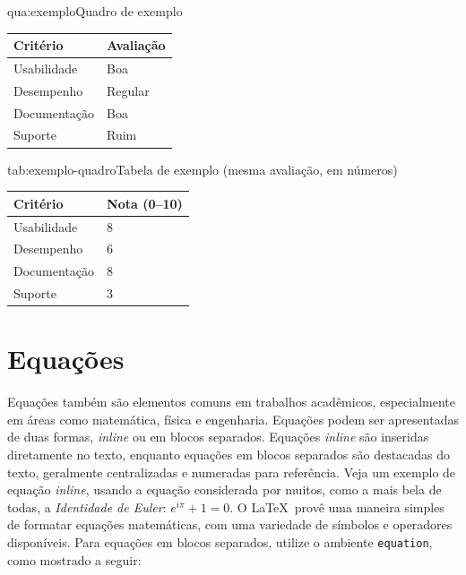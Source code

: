 \begin{quadroabnt}{qua:exemplo}{Quadro de exemplo}
    \caption*{Avaliação qualitativa: o dado central de cada célula é uma palavra, não um número — por isso é um Quadro, não uma Tabela.}
    \begin{tabular}{@{}ll@{}}
        \toprule
        Critério    & Avaliação \\ \midrule
        Usabilidade & Boa       \\
        Desempenho  & Regular   \\
        Documentação & Boa      \\
        Suporte     & Ruim      \\ \bottomrule
    \end{tabular}
\end{quadroabnt}

\begin{tabelaabnt}{tab:exemplo-quadro}{Tabela de exemplo (mesma avaliação, em números)}
    \caption*{A mesma avaliação do , agora com o dado numérico como informação central — por isso é uma Tabela.}
    \begin{tabular}{@{}ll@{}}
        \toprule
        Critério    & Nota (0--10) \\ \midrule
        Usabilidade & 8            \\
        Desempenho  & 6            \\
        Documentação & 8           \\
        Suporte     & 3            \\ \bottomrule
    \end{tabular}
\end{tabelaabnt}

\section{Equações}\label{sec:equacoes}

Equações também são elementos comuns em trabalhos acadêmicos, especialmente em áreas como
matemática, física e engenharia. Equações podem ser apresentadas de duas formas, \emph{inline} ou
em blocos separados. Equações \emph{inline} são inseridas diretamente no texto, enquanto equações em
blocos separados são destacadas do texto, geralmente centralizadas e numeradas para referência. Veja
um exemplo de equação \emph{inline}, usando a equação considerada por muitos, como a mais bela de
todas, a \emph{Identidade de Euler}: \(e^{i\pi} + 1 = 0\). O \LaTeX\ provê uma maneira simples de
formatar equações matemáticas, com uma variedade de símbolos e operadores disponíveis. Para equações
em blocos separados, utilize o ambiente \texttt{equation}, como mostrado a seguir:

